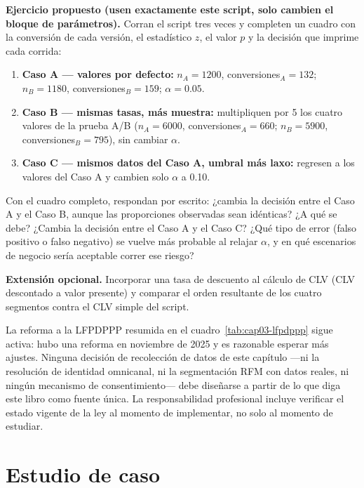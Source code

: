 \begin{cajaLaboratorio}
\textbf{Ejercicio propuesto (usen exactamente este script, solo cambien el
bloque de parámetros).} Corran el script tres veces y completen un cuadro
con la conversión de cada versión, el estadístico $z$, el valor $p$ y la
decisión que imprime cada corrida:
\begin{enumerate}
  \item \textbf{Caso A — valores por defecto:} $n_A=1200$, conversiones$_A=132$;
  $n_B=1180$, conversiones$_B=159$; $\alpha=0.05$.
  \item \textbf{Caso B — mismas tasas, más muestra:} multipliquen por 5 los
  cuatro valores de la prueba A/B ($n_A=6000$, conversiones$_A=660$;
  $n_B=5900$, conversiones$_B=795$), sin cambiar $\alpha$.
  \item \textbf{Caso C — mismos datos del Caso A, umbral más laxo:}
  regresen a los valores del Caso A y cambien solo $\alpha$ a 0.10.
\end{enumerate}
Con el cuadro completo, respondan por escrito: ¿cambia la decisión entre el
Caso A y el Caso B, aunque las proporciones observadas sean idénticas? ¿A
qué se debe? ¿Cambia la decisión entre el Caso A y el Caso C? ¿Qué tipo de
error (falso positivo o falso negativo) se vuelve más probable al relajar
$\alpha$, y en qué escenarios de negocio sería aceptable correr ese riesgo?

\textbf{Extensión opcional.} Incorporar una tasa de descuento al cálculo de
CLV (CLV descontado a valor presente) y comparar el orden resultante de los
cuatro segmentos contra el CLV simple del script.
\end{cajaLaboratorio}

\begin{cajaEtica}
La reforma a la LFPDPPP resumida en el cuadro~\ref{tab:cap03-lfpdppp} sigue
activa: hubo una reforma en noviembre de 2025 y es razonable esperar más
ajustes. Ninguna decisión de recolección de datos de este capítulo —ni la
resolución de identidad omnicanal, ni la segmentación RFM con datos reales,
ni ningún mecanismo de consentimiento— debe diseñarse a partir de lo que
diga este libro como fuente única. La responsabilidad profesional incluye
verificar el estado vigente de la ley al momento de implementar, no solo al
momento de estudiar.
\end{cajaEtica}

\section{Estudio de caso}

